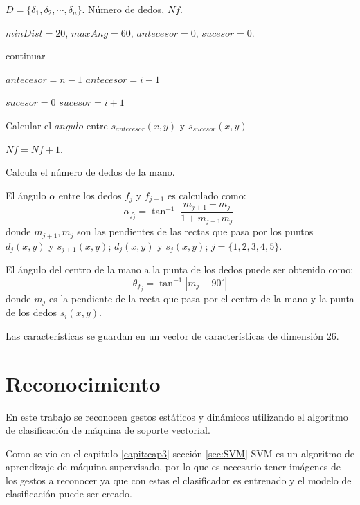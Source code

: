 \begin{algorithm}
\begin{algorithmic}[1]

\REQUIRE $D=\lbrace \delta_1, \delta_2, \cdots, \delta_n \rbrace$.  
\ENSURE Número de dedos, $Nf$.  

	\STATE $minDist=20$, $maxAng=60$, $antecesor=0$, $sucesor=0$. 	
	
	\STATE continuar
	\ENDIF 
	
	\STATE $antecesor=n-1$
	\ELSE
	\STATE $antecesor=i-1$
	\ENDIF 

	\STATE $sucesor=0$
	\ELSE
	\STATE $sucesor=i+1$
	\ENDIF   
	
	\STATE Calcular el $angulo$ entre $s_{antecesor}(x,y)$ y $s_{sucesor}(x,y)$
	
	\RETURN \FALSE
	\ENDIF  
	
	\STATE $Nf=Nf+1$.

\ENDFOR 
\caption{Calcula el número de dedos de la mano.}
\label{alg:NumDedos}
\end{algorithmic}
\end{algorithm}

El ángulo $\alpha$ entre los dedos $f_j$ y $f_{j+1}$ es calculado como:  
$$ \alpha_{f_j} = \tan^{-1}{ \bigg| \frac{m_{j+1}-m_j}{1+m_{j+1}m_j} \bigg|}$$
donde $m_{j+1},m_j$ son las pendientes de las rectas que pasa por los puntos $d_j(x,y)$ y $s_{j+1}(x,y)$; $d_j(x,y)$ y $s_j(x,y)$; $j=\lbrace 1,2,3,4,5 \rbrace$.  

El ángulo del centro de la mano a la punta de los dedos puede ser obtenido como: 
$$ \theta_{f_j} = \tan^{-1} | {m_j} - 90^\circ |$$
donde $m_j$ es la pendiente de la recta que pasa por el centro de la mano y la punta de los dedos $s_i(x,y)$.

Las características se guardan en un vector de características de dimensión $26$.



\section{Reconocimiento}\label{sec:ReconocimientoSystem}

En este trabajo se reconocen gestos estáticos y dinámicos utilizando el algoritmo de clasificación de máquina de soporte vectorial.  

Como se vio en el capitulo \ref{capit:cap3} sección \ref{sec:SVM} SVM es un algoritmo de aprendizaje de máquina supervisado, por lo que es necesario tener imágenes de los gestos a reconocer ya que con estas el clasificador es entrenado y el modelo de clasificación puede ser creado. 

